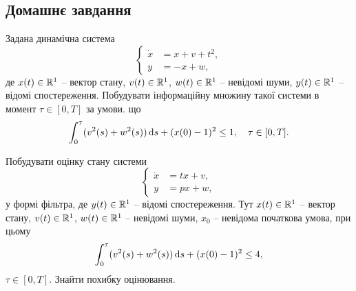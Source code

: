 \subsection{Домашнє завдання}

\begin{problem}
    Задана динамічна система
    \[ \left\{ \begin{aligned}
        \dot x &= x + v + t^2, \\
        y &= -x + w,
    \end{aligned} \right. \]
    де $x(t) \in \mathbb{R}^1$ -- вектор стану, $v(t)\in\mathbb{R}^1$, $w(t)\in\mathbb{R}^1$ -- невідомі шуми, $y(t)\in\mathbb{R}^1$ -- відомі спостереження. Побудувати інформаційну множину такої системи в момент $\tau\in[0, T]$ за умови. що 
    \[ \int_0^\tau (v^2(s) + w^2(s)) \mathop{}\!\mathrm{d} s + (x(0) - 1)^2 \le 1, \quad \tau \in [0, T]. \]
\end{problem}

\begin{solution}
\end{solution}

\begin{problem}
    Побудувати оцінку стану системи
    \[ \left\{ \begin{aligned}
        \dot x &= tx + v, \\
        y &= px + w,
    \end{aligned} \right. \]
    у формі фільтра, де $y(t)\in\mathbb{R}^1$ -- відомі спостереження. Тут $x(t) \in \mathbb{R}^1$ -- вектор стану, $v(t)\in\mathbb{R}^1$, $w(t)\in\mathbb{R}^1$ -- невідомі шуми, $x_0$ -- невідома початкова умова, при цьому
    \[ \int_0^\tau (v^2(s) + w^2(s)) \mathop{}\!\mathrm{d} s + (x(0) - 1)^2 \le 4, \]
    $\tau \in [0, T]$. Знайти похибку оцінювання.
\end{problem}

